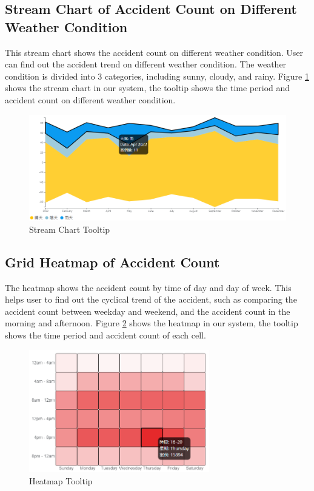 \documentclass[a4paper, oneside, final, 12pt]{scrartcl} %
\begin{document}
\subsection{Stream Chart of Accident Count on Different Weather Condition}

This stream chart shows the accident count on different weather condition.
User can find out the accident trend on different weather condition.
The weather condition is divided into 3 categories,
including sunny, cloudy, and rainy.
Figure \ref{fig: stream_tooltip} shows the stream chart in our system,
the tooltip shows the time period and accident count on different weather condition.

\begin{figure}[htbp]
  \centering
  \includegraphics[width=1.0\textwidth]{"./Image/stream_tooltip.png"}
  \caption{Stream Chart Tooltip}
  \label{fig: stream_tooltip}
\end{figure}

\subsection{Grid Heatmap of Accident Count}

The heatmap shows the accident count by time of day and day of week.
This helps user to find out the cyclical trend of the accident,
such as comparing the accident count between weekday and weekend,
and the accident count in the morning and afternoon.
Figure \ref{fig: heatmap_tooltip} shows the heatmap in our system,
the tooltip shows the time period and accident count of each cell.

\begin{figure}[htbp]
  \centering
  \includegraphics[width=0.7\textwidth]{"./Image/heatmap_tooltip.png"}
  \caption{Heatmap Tooltip}
  \label{fig: heatmap_tooltip}
\end{figure}
\end{document}
